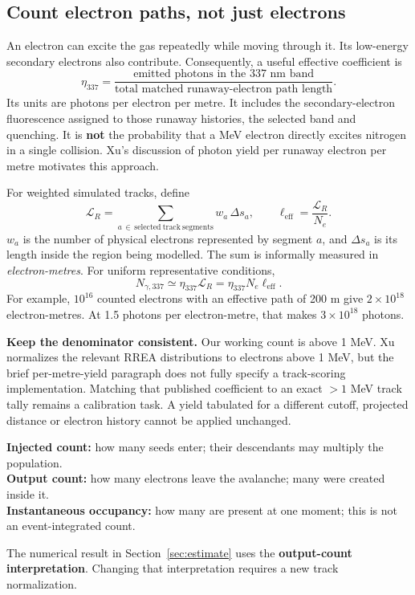 \documentclass[11pt,a4paper]{article}
\newcommand{\xu}[1]{\cite[#1]{Xu2015}}
\begin{document}
\clearpage
\subsection{Count electron paths, not just electrons}
\label{sec:trackbudget}
An electron can excite the gas repeatedly while moving through it. Its low-energy secondary electrons also contribute. Consequently, a useful effective coefficient is
\[
 \eta_{337}=\frac{\text{emitted photons in the 337 nm band}}
 {\text{total matched runaway-electron path length}}.
\]
Its units are photons per electron per metre. It includes the secondary-electron fluorescence assigned to those runaway histories, the selected band and quenching. It is \textbf{not} the probability that a MeV electron directly excites nitrogen in a single collision. Xu's discussion of photon yield per runaway electron per metre motivates this approach.\xu{Sec.~4.1}

For weighted simulated tracks, define
\begin{equation}
 \mathcal L_R=\sum_{a\,\in\,\mathrm{selected\ track\ segments}}w_a\,\Delta s_a,
 \qquad
 \ell_{\mathrm{eff}}=\frac{\mathcal L_R}{N_e}.
 \label{eq:trackbudget}
\end{equation}
$w_a$ is the number of physical electrons represented by segment $a$, and $\Delta s_a$ is its length inside the region being modelled. The sum is informally measured in \emph{electron-metres}. For uniform representative conditions,
\begin{equation}
 \boxed{N_{\gamma,337}\simeq\eta_{337}\mathcal L_R
       =\eta_{337}N_e\ell_{\mathrm{eff}}.}
 \label{eq:totalphotons}
\end{equation}
For example, $10^{16}$ counted electrons with an effective path of 200 m give $2\times10^{18}$ electron-metres. At 1.5 photons per electron-metre, that makes $3\times10^{18}$ photons.

\textbf{Keep the denominator consistent.} Our working count is above 1 MeV. Xu normalizes the relevant RREA distributions to electrons above 1 MeV, but the brief per-metre-yield paragraph does not fully specify a track-scoring implementation. Matching that published coefficient to an exact $>1$ MeV track tally remains a calibration task. A yield tabulated for a different cutoff, projected distance or electron history cannot be applied unchanged.\xu{Secs.~2.3, 3.2.1 and 4.1}

\begin{keybox}
\textbf{Injected count:} how many seeds enter; their descendants may multiply the population.\\
\textbf{Output count:} how many electrons leave the avalanche; many were created inside it.\\
\textbf{Instantaneous occupancy:} how many are present at one moment; this is not an event-integrated count.

The numerical result in Section~\ref{sec:estimate} uses the \textbf{output-count interpretation}. Changing that interpretation requires a new track normalization.
\end{keybox}
\end{document}
